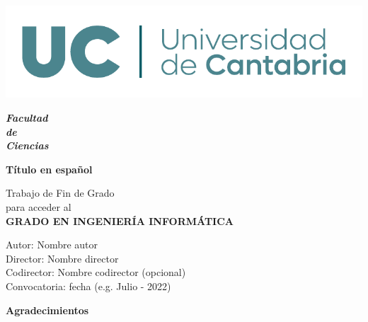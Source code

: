 \documentclass{article}
\begin{document}
	\begin{titlepage}
		{\selectfont
			\begin{center}
				\vspace*{-2.5cm}
				
				\includegraphics[width=\linewidth]{images/logoUC.pdf}
				
				\vspace{0.2cm}
				\textbf{\Huge\emph{Facultad \\
						de\\
						Ciencias}}
				
				\vspace{1cm}
				\textbf{\fontsize{20}{24}\selectfont Título en español}\\
				\fontsize{19}{24}\selectfont {Título en inglés}
				
				\vspace{1.5cm}
				\fontsize{14}{17}\selectfont Trabajo de Fin de Grado\\
				para acceder al\\
                \vspace{0.5cm}
				\textbf{\fontsize{17}{20}\selectfont GRADO EN INGENIERÍA INFORMÁTICA}
				
				\vfill
				
				
				\vspace{0.8cm}
				
				
				\begin{flushright}
					\fontsize{14}{17}
					Autor: Nombre autor\\
					Director: Nombre director\\
					Codirector: Nombre codirector (opcional)\\
					Convocatoria: fecha (e.g. Julio - 2022)
				\end{flushright}
				
				
		\end{center}}
	\end{titlepage}


\newpage
\begin{center}
{\bf \Huge Agradecimientos}
\end{center}
\vspace{1cm}
\setlength{\baselineskip}{0.8cm}
\onehalfspacing
\begin{flushleft}



\end{flushleft}
\end{document}
